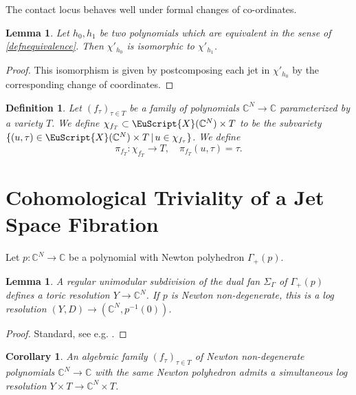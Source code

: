 \documentclass[11pt]{amsart}
\newtheorem{defn}[thm]{Definition}
\newtheorem{cor}[thm]{Corollary}
\newtheorem{lemma}[thm]{Lemma}
\newcommand{\scrX}{\EuScript{X}}
\newcommand{\bC}{\mathbb{C}}
\numberwithin{equation}{section}
\newcommand{\C}{\mathbb C}
\begin{document}
The contact locus behaves well under formal changes of co-ordinates.

\begin{lemma} \label{lemmaChangeOfCoordinatrd}
	Let $h_0,h_1$ be two polynomials which are equivalent in the sense of \ref{defnequivalence}.
	Then $\chi'_{h_0}$ is isomorphic to $\chi'_{h_1}$.
\end{lemma}
\begin{proof}
	This isomorphism is given by postcomposing each jet in $\chi'_{h_0}$ by the corresponding change of coordinates.
\end{proof}


\begin{defn}
	Let $(f_\tau)_{\tau \in T}$ be a family of polynomials $\bC^N \to \bC$ parameterized by a variety $T$. We define $\chi_{f_T} \subset \scrX(\bC^N) \times T$ to be the subvariety $\{ (u,\tau) \in \scrX(\bC^N) \times T \, | \, u \in \chi_{f_\tau} \}$.
	We define
	\begin{equation} \label{eqnprojectionmap}
		\pi_{f_T} : \chi_{f_T} \to T, \quad \pi_{f_T}(u,\tau) = \tau.
	\end{equation}
\end{defn}





\section{Cohomological Triviality of a Jet Space Fibration}

Let $p:\bC^N \to \bC$ be a polynomial with Newton polyhedron $\Gamma_+(p)$.

\begin{lemma}
	A regular unimodular subdivision of the dual fan $\Sigma_{\Gamma}$ of $\Gamma_+(p)$ defines a toric resolution $Y \to \bC^N$. If $p$ is Newton non-degenerate, this is a log resolution $(Y,D) \to (\bC^N,p^{-1}(0))$.
\end{lemma}

\begin{proof}
	Standard, see e.g. \cite{CLS}.
\end{proof}

\begin{cor}\label{cor:simultaneous}
	An algebraic family $(f_\tau)_{\tau \in T}$ of Newton non-degenerate polynomials $\C^N \to \C$ with the same Newton polyhedron admits a simultaneous log resolution $Y \times T \to \bC^N \times T$.
\end{cor}
\end{document}
